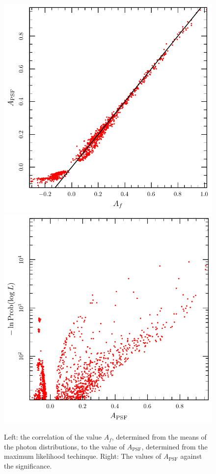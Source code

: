 \documentclass[useAMS,usenatbib]{mn2e}
\begin{document}
\begin{figure}
  \includegraphics[width=\columnwidth]{acorr}
  \includegraphics[width=\columnwidth]{asigcorr}
  \caption{Left: the correlation of the value $A_f$, determined from
    the means of the photon distributions, to the value of
    $A_\mathrm{PSF}$, determined from the maximum likelihood
    techinque.  Right: The values of $A_\mathrm{PSF}$ against the
    significance.}
  \label{fig:acorr}
\end{figure}
\end{document}
